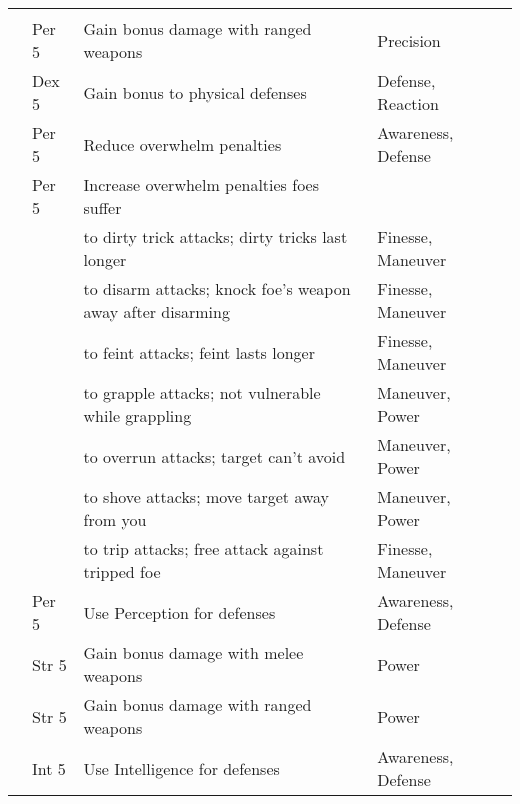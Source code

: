{\begin{longtabu}{>{\lcol}p{10em} >{\lcol}p{15em} >{\lcol}X >{\lcol}p{6em} >{\lcol}p{3em}}
        \midrule
         &  &  &  &  \\
         & Per 5 & Gain bonus damage with ranged weapons & Precision &  \\
         & Dex 5 & Gain bonus to physical defenses & Defense, Reaction &  \\
         & Per 5 & Reduce overwhelm penalties & Awareness, Defense &  \\
         & Per 5 & Increase overwhelm penalties foes suffer & \x &  \\
         & \x &  to dirty trick attacks; dirty tricks last longer & Finesse, Maneuver &  \\
         & \x &  to disarm attacks; knock foe's weapon away after disarming & Finesse, Maneuver &  \\
         & \x &  to feint attacks; feint lasts longer & Finesse, Maneuver &  \\
         & \x &  to grapple attacks; not vulnerable while grappling & Maneuver, Power &  \\
         & \x &  to overrun attacks; target can't avoid & Maneuver, Power &  \\
         & \x &  to shove attacks; move target away from you & Maneuver, Power &  \\
         & \x &  to trip attacks; free attack against tripped foe & Finesse, Maneuver &  \\
         & Per 5 & Use Perception for defenses & Awareness, Defense &  \\
         & Str 5 & Gain bonus damage with melee weapons & Power &  \\
         & Str 5 & Gain bonus damage with ranged weapons & Power &  \\
         & Int 5 & Use Intelligence for defenses & Awareness, Defense &  \\

\end{longtabu}}
